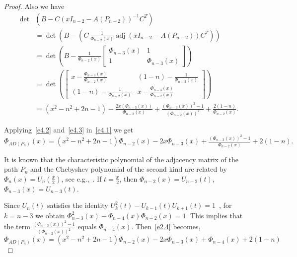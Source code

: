 \documentclass[12pt]{article}
\numberwithin{equation}{section}
\DeclareMathOperator{\adj}{adj}
\begin{document}
\begin{proof}
		Also we have \begin{align}
				\det & \left( B - C (xI_{n-2}-A(P_{n-2}))^{-1} C^T \right) \nonumber\\
			& = \det \left(B-  \left(C~ \tfrac{1}{\Phi_{n-2}(x)} \adj(xI_{n-2}-A(P_{n-2}))  C^{T}\right)\right)\nonumber \\
			& = \det\left( B - \tfrac{1}{\Phi_{n-2}(x)} \begin{bmatrix}
				\Phi_{n-3}(x)  & 1  \\
				1 & \Phi_{n-3}(x)
			\end{bmatrix}\right) \nonumber \\
				& = \det\left(
			\begin{bmatrix}
				x-\tfrac{\Phi_{n-3}(x)}{\Phi_{n-2}(x)}& (1-n) -\tfrac{1}{\Phi_{n-2}(x)} \\
				(1-n) -\tfrac{1}{\Phi_{n-2}(x)} & x-\tfrac{\Phi_{n-3}(x)}{\Phi_{n-2}(x)}
			\end{bmatrix}\right) \nonumber\\
			&= 	\left(x^2-n^2+2n-1\right)- \tfrac{2x(\Phi_{n-3}(x))}{\Phi_{n-2}(x)} 
			+\tfrac{(\Phi_{n-3}(x))^2-1}{(\Phi_{n-2}(x))^2}+\tfrac{2(1-n)}{\Phi_{n-2}(x)}. \label{e4.3}
			\end{align}
		
 	Applying~\eqref{e4.2} and~\eqref{e4.3} in~\eqref{e4.1} we get 
		\begin{equation}\label{e2.4}
			\Phi_{AD(P_n)}(x)=\left(x^2-n^2+2n-1\right) \Phi_{n-2}(x) - 2x \Phi_{n-3}(x) 
			+\tfrac{(\Phi_{n-3}(x))^2-1}{\Phi_{n-2}(x)}+2(1-n).
		\end{equation} 
			
	It is known that the characteristic polynomial of the adjacency matrix of the path
	$P_n$ and  the Chebyshev polynomial of the second kind are related by $\Phi_{n}(x)=U_n(\tfrac{x}{2})$, see e.g.,~\cite{cvetkovic2010introduction}. If $t=\tfrac{x}{2}$, then $\Phi_{n-2}(x)=U_{n-2}(t)$, $\Phi_{n-3}(x)=U_{n-3}(t)$.
		
		Since $U_n(t)$ satisfies the identity $U^2_k(t)-U_{k-1}(t)U_{k+1}(t)=1$~\cite[Eqn. 3.21]{voll2010cassini}, for $k=n-3$ we obtain $\Phi^2_{n-3}(x)-\Phi_{n-4}(x)\Phi_{n-2}(x)=1$. This implies that the term $\tfrac{(\Phi_{n-3}(x))^2-1}{(\Phi_{n-2}(x))^2}$ equals $\Phi_{n-4}(x)$. Then~\eqref{e2.4} becomes,
		\begin{equation}\label{e2.5}
			\Phi_{AD(P_n)}(x)=\left(x^2-n^2+2n-1\right) \Phi_{n-2}(x) - 2x \Phi_{n-3}(x)+\Phi_{n-4}(x)+2(1-n)
		\end{equation}
		

\end{proof}
\end{document}
